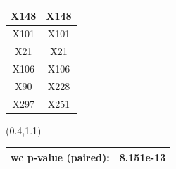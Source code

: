 \documentclass{beamer}
\newcommand{\boz}{\cellcolor{pathwaynode}}
\begin{document}
\begin{frame}[plain]
\begin{textblock*}{\paperwidth}
\begin{tabular}{| c c |}
\boz X148   &  \boz X148  \\ \hline
X101   &  X101  \\ \hline
X21   &  X21  \\ \hline
X106   &  X106  \\ \hline
X90   &  \boz X228  \\ \hline
X297   &  X251  \\ \hline
    \end{tabular}
    \hspace{.5em}
  \end{textblock*}
  \begin{textblock*}{\paperwidth}(0.4\textwidth,1.1\textheight)
    \raggedright 
    \tiny
    \begin{tabular}{| c c |}
      \hline
      wc p-value (paired): & 8.151e-13 \\ \hline
    \end{tabular}
    \hspace{.5em}
  \end{textblock*}
\end{frame}
\end{document}
